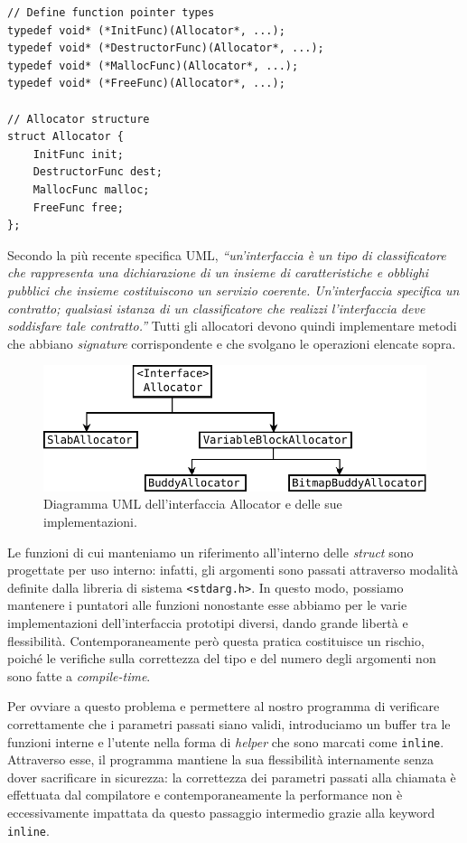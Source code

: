 \begin{lstlisting}
// Define function pointer types
typedef void* (*InitFunc)(Allocator*, ...);
typedef void* (*DestructorFunc)(Allocator*, ...);
typedef void* (*MallocFunc)(Allocator*, ...);  
typedef void* (*FreeFunc)(Allocator*, ...); 

// Allocator structure
struct Allocator {
    InitFunc init; 
    DestructorFunc dest;
    MallocFunc malloc;
    FreeFunc free; 
};
\end{lstlisting}

Secondo la più recente specifica UML, \textit{“un'interfaccia è un tipo di classificatore che rappresenta una dichiarazione di un insieme di caratteristiche e obblighi pubblici che insieme costituiscono un servizio coerente. Un'interfaccia specifica un contratto; qualsiasi istanza di un classificatore che realizzi l'interfaccia deve soddisfare tale contratto.”} Tutti gli allocatori devono quindi implementare metodi che abbiano \textit{signature} corrispondente e che svolgano le operazioni elencate sopra.

\begin{figure}[H]
    \centering
    \includegraphics[width=1\textwidth]{images/allocator_interface_uml.pdf}
    \caption{Diagramma UML dell'interfaccia Allocator e delle sue implementazioni.}
    \label{fig:uml_allocator_interface}
\end{figure}

Le funzioni di cui manteniamo un riferimento all'interno delle \textit{struct} sono progettate per uso interno: infatti, gli argomenti sono passati attraverso modalità definite dalla libreria di sistema \texttt{<stdarg.h>}. In questo modo, possiamo mantenere i puntatori alle funzioni nonostante esse abbiamo per le varie implementazioni dell'interfaccia prototipi diversi, dando grande libertà e flessibilità. Contemporaneamente però questa pratica costituisce un rischio, poiché le verifiche sulla correttezza del tipo e del numero degli argomenti non sono fatte a \textit{compile-time}.

Per ovviare a questo problema e permettere al nostro programma di verificare correttamente che i parametri passati siano validi, introduciamo un buffer tra le funzioni interne e l’utente nella forma di \textit{helper} che sono marcati come \texttt{inline}. Attraverso esse, il programma mantiene la sua flessibilità internamente senza dover sacrificare in sicurezza: la correttezza dei parametri passati alla chiamata è effettuata dal compilatore e contemporaneamente la performance non è eccessivamente impattata da questo passaggio intermedio grazie alla keyword \texttt{inline}. 

